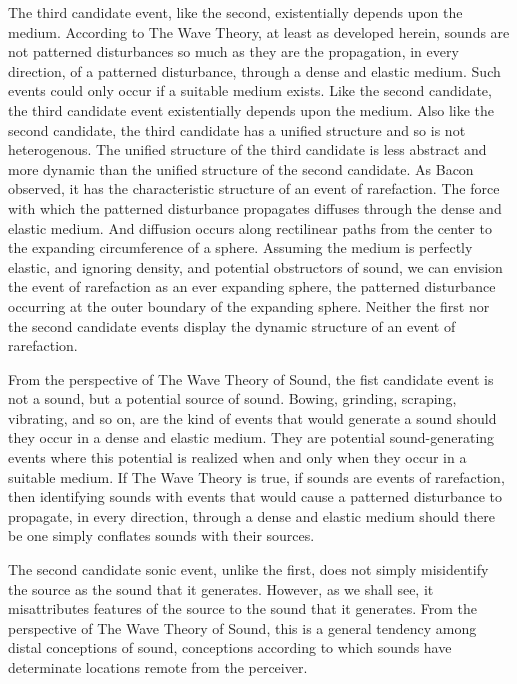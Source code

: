 \documentclass[12pt]{article}
\begin{document}
The third candidate event, like the second, existentially depends upon the medium. According to The Wave Theory, at least as developed herein, sounds are not patterned disturbances so much as they are the propagation, in every direction, of a patterned disturbance, through a dense and elastic medium. Such events could only occur if a suitable medium exists. Like the second candidate, the third candidate event existentially depends upon the medium. Also like the second candidate, the third candidate has a unified structure and so is not heterogenous. The unified structure of the third candidate is less abstract and more dynamic than the unified structure of the second candidate. As Bacon observed, it has the characteristic structure of an event of rarefaction. The force with which the patterned disturbance propagates diffuses through the dense and elastic medium. And diffusion occurs along rectilinear paths from the center to the expanding circumference of a sphere. Assuming the medium is perfectly elastic, and ignoring density, and potential obstructors of sound, we can envision the event of rarefaction as an ever expanding sphere, the patterned disturbance occurring at the outer boundary of the expanding sphere. Neither the first nor the second candidate events display the dynamic structure of an event of rarefaction.

From the perspective of The Wave Theory of Sound, the fist candidate event is not a sound, but a potential source of sound. Bowing, grinding, scraping, vibrating, and so on, are the kind of events that would generate a sound should they occur in a dense and elastic medium. They are potential sound-generating events where this potential is realized when and only when they occur in a suitable medium. If The Wave Theory is true, if sounds are events of rarefaction, then identifying sounds with events that would cause a patterned disturbance to propagate, in every direction, through a dense and elastic medium should there be one simply conflates sounds with their sources.

The second candidate sonic event, unlike the first, does not simply misidentify the source as the sound that it generates. However, as we shall see, it misattributes features of the source to the sound that it generates. From the perspective of The Wave Theory of Sound, this is a general tendency among distal conceptions of sound, conceptions according to which sounds have determinate locations remote from the perceiver. 

\end{document}

